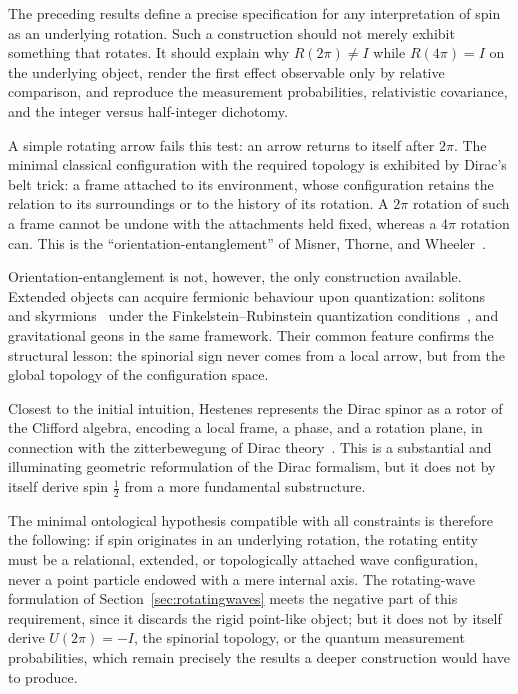\documentclass[11pt,a4paper]{article}
\begin{document}
The preceding results define a precise specification for any interpretation of spin as an underlying
rotation.
Such a construction should not merely exhibit something that rotates.
It should explain why $R(2\pi) \neq I$ while $R(4\pi) = I$ on the underlying object, render the first effect
observable only by relative comparison, and reproduce the measurement probabilities, relativistic
covariance, and the integer versus half-integer dichotomy.

A simple rotating arrow fails this test: an arrow returns to itself after $2\pi$.
The minimal classical configuration with the required topology is exhibited by Dirac's belt trick: a frame
attached to its environment, whose configuration retains the relation to its surroundings or to the history
of its rotation.
A $2\pi$ rotation of such a frame cannot be undone with the attachments held fixed, whereas a $4\pi$
rotation can.
This is the ``orientation-entanglement'' of Misner, Thorne, and Wheeler~\cite{Misner1973}.

Orientation-entanglement is not, however, the only construction available.
Extended objects can acquire fermionic behaviour upon quantization: solitons and skyrmions~\cite{Skyrme1961}
under the Finkelstein--Rubinstein quantization conditions~\cite{Finkelstein1968}, and gravitational geons in
the same framework.
Their common feature confirms the structural lesson: the spinorial sign never comes from a local arrow, but
from the global topology of the configuration space.

Closest to the initial intuition, Hestenes represents the Dirac spinor as a rotor of the Clifford algebra,
encoding a local frame, a phase, and a rotation plane, in connection with the zitterbewegung of Dirac
theory~\cite{Hestenes1990}.
This is a substantial and illuminating geometric reformulation of the Dirac formalism, but it does not by
itself derive spin $\tfrac12$ from a more fundamental substructure.

The minimal ontological hypothesis compatible with all constraints is therefore the following: if spin
originates in an underlying rotation, the rotating entity must be a relational, extended, or topologically
attached wave configuration, never a point particle endowed with a mere internal axis.
The rotating-wave formulation of Section~\ref{sec:rotatingwaves} meets the negative part of this
requirement, since it discards the rigid point-like object; but it does not by itself derive
$U(2\pi) = -I$, the spinorial topology, or the quantum measurement probabilities, which remain precisely
the results a deeper construction would have to produce.
\end{document}
